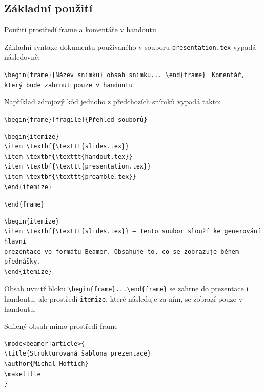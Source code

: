 \subsection{Základní použití}


\begin{frame}[fragile]{Použití prostředí frame a komentáře v handoutu}

\begin{block}{}
Základní syntaxe dokumentu používaného v souboru \verb|presentation.tex| vypadá následovně:
\end{block}

\begin{likeverbatim}\verb|\begin{frame}{Název snímku}|\
\verb|obsah snímku...|\
\verb|\end|\verb|{frame}|\
\vspace{1em}
\verb|Komentář, který bude zahrnut pouze v handoutu|
\end{likeverbatim}

\end{frame}

Například zdrojový kód jednoho z předchozích snímků vypadá takto:

\verb|\begin|\verb|{frame}[fragile]{Přehled souborů}|
\begin{verbatim}
\begin{itemize}
\item \textbf{\texttt{slides.tex}}
\item \textbf{\texttt{handout.tex}}
\item \textbf{\texttt{presentation.tex}}
\item \textbf{\texttt{preamble.tex}}
\end{itemize}
\end{verbatim}
\verb|\end|\verb|{frame}|

\begin{verbatim}
\begin{itemize}
\item \textbf{\texttt{slides.tex}} – Tento soubor slouží ke generování hlavní
prezentace ve formátu Beamer. Obsahuje to, co se zobrazuje během přednášky.
\end{itemize}
\end{verbatim}

Obsah uvnitř bloku \verb|\begin|\verb|{frame}...\end|\verb|{frame}| se zahrne
do prezentace i handoutu, ale prostředí \texttt{itemize}, které následuje za
ním, se zobrazí pouze v handoutu.

\begin{frame}[fragile]{Sdílený obsah mimo prostředí frame}

\begin{verbatim}
\mode<beamer|article>{
\title{Strukturovaná šablona prezentace}
\author{Michal Hoftich}
\maketitle
}
\end{verbatim}
\end{frame}


